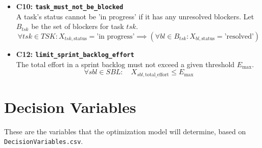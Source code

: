 \documentclass[11pt, a4paper]{article}
\begin{document}
\begin{itemize}
    \item \textbf{C10: \texttt{task\_must\_not\_be\_blocked}}
    \\ A task's status cannot be 'in progress' if it has any unresolved blockers. Let $B_{tsk}$ be the set of blockers for task $tsk$.
    $$ \forall tsk \in TSK: X_{tsk, \text{status}} = \text{'in progress'} \implies (\forall bl \in B_{tsk}: X_{bl, \text{status}} = \text{'resolved'}) $$

    \item \textbf{C12: \texttt{limit\_sprint\_backlog\_effort}}
    \\ The total effort in a sprint backlog must not exceed a given threshold $E_{\max}$.
    $$ \forall sbl \in SBL: \quad X_{sbl, \text{total\_effort}} \le E_{\max} $$
\end{itemize}


\section{Decision Variables}
These are the variables that the optimization model will determine, based on \texttt{DecisionVariables.csv}.
\end{document}
